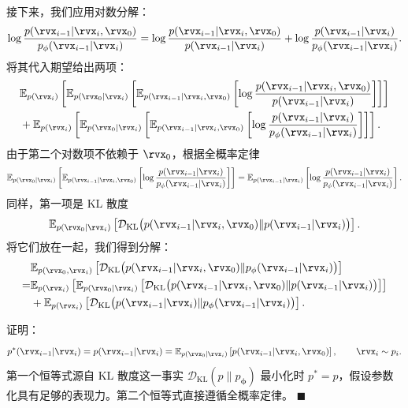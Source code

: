 接下来，我们应用对数分解：
\begin{align*}
    \log \frac{p(\rvx_{i-1}|\rvx_i, \rvx_0)}{p_\phi(\rvx_{i-1}|\rvx_i)}
    =\log \frac{p(\rvx_{i-1}|\rvx_i, \rvx_0)}{p(\rvx_{i-1}|\rvx_i)}
    + \log \frac{p(\rvx_{i-1}|\rvx_i)}{p_\phi(\rvx_{i-1}|\rvx_i)}.
\end{align*}
将其代入期望给出两项：
\begin{align*}
    &\mathbb{E}_{p(\rvx_i)} \left[
    \mathbb{E}_{p(\rvx_0|\rvx_i)} \left[
    \mathbb{E}_{p(\rvx_{i-1}|\rvx_i, \rvx_0)} \left[
    \log \frac{p(\rvx_{i-1}|\rvx_i, \rvx_0)}{p(\rvx_{i-1}|\rvx_i)}
    \right]
    \right]
    \right]
    \\
    &+
    \mathbb{E}_{p(\rvx_i)} \left[
    \mathbb{E}_{p(\rvx_0|\rvx_i)} \left[
    \mathbb{E}_{p(\rvx_{i-1}|\rvx_i, \rvx_0)} \left[
    \log \frac{p(\rvx_{i-1}|\rvx_i)}{p_\phi(\rvx_{i-1}|\rvx_i)}
    \right]
    \right]
    \right].
\end{align*}
由于第二个对数项不依赖于 $\rvx_0$，根据全概率定律
\begin{align*}
    \mathbb{E}_{p(\rvx_0|\rvx_i)} \left[
    \mathbb{E}_{p(\rvx_{i-1}|\rvx_i, \rvx_0)} \left[
    \log \frac{p(\rvx_{i-1}|\rvx_i)}{p_\phi(\rvx_{i-1}|\rvx_i)}
    \right]
    \right]
    = \mathbb{E}_{p(\rvx_{i-1}|\rvx_i)} \left[
    \log \frac{p(\rvx_{i-1}|\rvx_i)}{p_\phi(\rvx_{i-1}|\rvx_i)}
    \right].
\end{align*}
同样，第一项是 KL 散度
\begin{align*}
    \mathbb{E}_{p(\rvx_0|\rvx_i)} \left[
    \mathcal{D}_{\text{KL}} \big(p(\rvx_{i-1}|\rvx_i, \rvx_0)  \|  p(\rvx_{i-1}|\rvx_i)\big)
    \right].
\end{align*}
将它们放在一起，我们得到分解：
\begin{align*}
    &\mathbb{E}_{p(\rvx_0, \rvx_i)} \left[
    \mathcal{D}_{\text{KL}} \big(p(\rvx_{i-1}|\rvx_i, \rvx_0)  \|  p_\phi(\rvx_{i-1}|\rvx_i)\big)
    \right]
    \\
    =& \mathbb{E}_{p(\rvx_i)} \left[
    \mathbb{E}_{p(\rvx_0|\rvx_i)} \left[
    \mathcal{D}_{\text{KL}} \big(p(\rvx_{i-1}|\rvx_i, \rvx_0)  \|  p(\rvx_{i-1}|\rvx_i)\big)
    \right]
    \right]
    \\
    &+
    \mathbb{E}_{p(\rvx_i)} \left[
    \mathcal{D}_{\text{KL}} \big(p(\rvx_{i-1}|\rvx_i)  \|  p_\phi(\rvx_{i-1}|\rvx_i)\big)
    \right].
\end{align*}

 证明：
\[
p^*(\rvx_{i-1}|\rvx_i)
=
p(\rvx_{i-1}|\rvx_i)
=
\mathbb{E}_{p(\rvx_0|\rvx_i)}
\left[
p(\rvx_{i-1}|\rvx_i,\rvx_0)
\right],
\qquad
\rvx_i \sim p_i.
\]
第一个恒等式源自 KL 散度这一事实 $\mathcal{D}_{\mathrm{KL}}(p \| p_{\bm{\phi}})$ 最小化时 $p^* = p$，假设参数化具有足够的表现力。第二个恒等式直接遵循全概率定律。
\hfill$\blacksquare$


